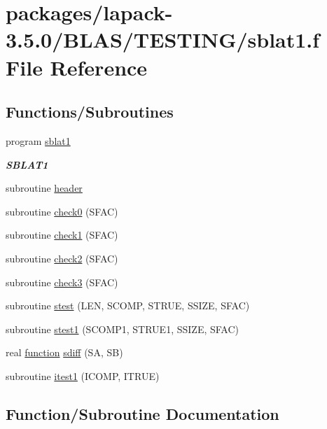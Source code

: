 \hypertarget{sblat1_8f}{}\section{packages/lapack-\/3.5.0/\+B\+L\+A\+S/\+T\+E\+S\+T\+I\+N\+G/sblat1.f File Reference}
\label{sblat1_8f}
\subsection*{Functions/\+Subroutines}
\begin{DoxyCompactItemize}
\item 
program \hyperlink{group__single__blas__testing_gaed614e5d25dd65001fae0671947d4b3c}{sblat1}
\begin{DoxyCompactList}\small\item\em {\bfseries S\+B\+L\+A\+T1} \end{DoxyCompactList}\item 
subroutine \hyperlink{sblat1_8f_a410931b600854e6dd3e253731606117e}{header}
\item 
subroutine \hyperlink{sblat1_8f_a6b8b27d47ac5950cd0325a24b2b37954}{check0} (S\+F\+A\+C)
\item 
subroutine \hyperlink{sblat1_8f_a87cda69493417357e26ad280bc547317}{check1} (S\+F\+A\+C)
\item 
subroutine \hyperlink{sblat1_8f_a9ff9298afee60deb7ffaea43a6d1b668}{check2} (S\+F\+A\+C)
\item 
subroutine \hyperlink{sblat1_8f_a011668799647094e60c6a7c2ad859b65}{check3} (S\+F\+A\+C)
\item 
subroutine \hyperlink{sblat1_8f_a077aa8449e1055cdecdebf7cb41738a5}{stest} (L\+E\+N, S\+C\+O\+M\+P, S\+T\+R\+U\+E, S\+S\+I\+Z\+E, S\+F\+A\+C)
\item 
subroutine \hyperlink{sblat1_8f_ab395702962b4ce31a8b18ae8c74d7f97}{stest1} (S\+C\+O\+M\+P1, S\+T\+R\+U\+E1, S\+S\+I\+Z\+E, S\+F\+A\+C)
\item 
real \hyperlink{afunc_8m_a7b5e596df91eadea6c537c0825e894a7}{function} \hyperlink{sblat1_8f_a493e960a0792ad29e73d02d04c77ca29}{sdiff} (S\+A, S\+B)
\item 
subroutine \hyperlink{sblat1_8f_af82694537a350a6cb3615ece843dcede}{itest1} (I\+C\+O\+M\+P, I\+T\+R\+U\+E)
\end{DoxyCompactItemize}


\subsection{Function/\+Subroutine Documentation}
\hypertarget{sblat1_8f_a6b8b27d47ac5950cd0325a24b2b37954}{}

